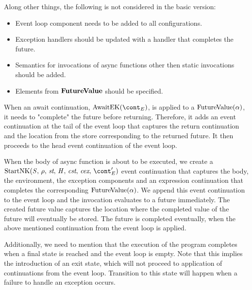 \documentclass[a4paper,oneside,fleqn]{article}
\begin{document}
Along other things, the following is not considered in the basic version:
\begin{itemize}
	\item Event loop component needs to be added to all configurations.
    \item Exception handlers should be updated with a handler that completes the future.

    \item Semantics for invocations of async functions other then static invocations should be added.

    \item Elements from $\mathbf{FutureValue}$ should be specified.

\end{itemize}


When an await continuation, $\AwaitEK$, is applied to a $\mathrm{FutureValue}(\alpha)$, it needs to "complete" the future before returning.
Therefore, it adds an event continuation at the tail of the event loop that captures the return continuation and the location from the store corresponding to the returned future.
It then proceeds to the head event continuation of the event loop.

When the body of async function is about to be executed, we create a $\StartNK{\stmt}{\env}{\strace}{\econt'}$ event continuation that captures the body, the environment, the exception components and an expression continuation that completes the corresponding $\mathrm{FutureValue}(\alpha)$.
We append this event continuation to the event loop and the invocation evaluates to a future immediately.
The created future value captures the location where the completed value of the future will eventually be stored.
The future is completed eventually, when the above mentioned continuation from the event loop is applied.

Additionally, we need to mention that the execution of the program completes when a final state is reached and the event loop is empty.
Note that this implies the introduction of an exit state, which will not proceed to application of continuations from the event loop.
Transition to this state will happen when a failure to handle an exception occurs.
\end{document}
